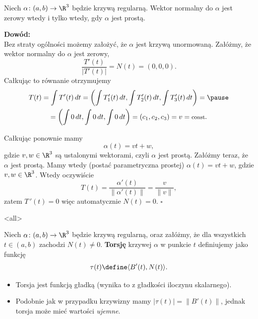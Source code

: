 \begin{frame}

\begin{lemat}
Niech $\alpha\colon (a,b)\to \R^3$ będzie krzywą regularną. Wektor normalny do $\alpha$ jest zerowy wtedy i tylko wtedy, gdy $\alpha$ jest prostą.
\end{lemat}
\pause\textcolor{ared}{\textbf{Dowód:}}\\
Bez straty ogólności możemy założyć, że $\alpha$ jest krzywą unormowaną.
\pause Załóżmy, że wektor normalny do $\alpha$ jest zerowy, \[\frac{T'(t)}{|T'(t)|}=N(t)=(0,0,0).\] \pause 
Całkując to równanie otrzymujemy 
 \begin{multline*}
T(t)=\int T'(t)\,dt=\left(\int T_1 '(t)\,dt,\int T_2 '(t)\,dt, \int T_3 '(t)\,dt\right)=\pause\\=\left(\int 0\,dt,\int 0\,dt, \int 0\,dt\right)=(c_1,c_2,c_3)=v=\text{\footnotesize{const}}.
\end{multline*}


\end{frame}
\begin{frame}[<+->]
Całkując ponownie mamy \[\alpha(t)=vt+w,\] gdzie $v,w\in \R^3$ są ustalonymi wektorami, czyli $\alpha$ jest prostą.
\pause 
Załóżmy teraz, że $\alpha$ jest prostą. \pause Mamy wtedy (postać parametryczna prostej) $\alpha(t)=vt+w$, gdzie $v,w\in \R^3$. \pause Wtedy oczywiście \[T(t)=\frac{\alpha'(t)}{\|\alpha'(t)\|}=\frac{v}{\|v\|},\] zatem $T\,'(t)=0$ więc automatycznie $N(t)=0$.
\hfill $\square$

\end{frame}
\mode<all>{}
\begin{frame}
\begin{definicja}
Niech $\alpha\colon (a,b)\to \R^3$ będzie krzywą regularną, oraz załóżmy, że dla wszystkich $t\in (a,b)$ zachodzi $N(t)\neq 0$. \textbf{Torsję} krzywej $\alpha$ w punkcie $t$ definiujemy jako funkcję \[\tau(t)\define \langle B'(t),N(t)\rangle.\]
\end{definicja}
\pause
\begin{uwaga}
\begin{itemize}
\item Torsja jest funkcją gładką (wynika to z gładkości iloczynu skalarnego).
\pause\item Podobnie jak w przypadku krzywizny mamy $|\tau(t)|=\|B'(t)\|$, 
jednak torsja może mieć wartości \textit{ujemne}.
\end{itemize}
\end{uwaga}

\end{frame}
